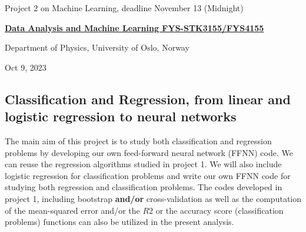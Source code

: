 \documentclass[%
oneside,                 %
final,                   %
10pt]{article}
\begin{document}

\newcommand{\exercisesection}[1]{\subsection*{#1}}






\thispagestyle{empty}

\begin{center}
{\LARGE\bf
\begin{spacing}{1.25}
Project 2 on Machine Learning, deadline November 13 (Midnight)
\end{spacing}
}
\end{center}


\begin{center}
{\bf \href{{http://www.uio.no/studier/emner/matnat/fys/FYS3155/index-eng.html}}{Data Analysis and Machine Learning FYS-STK3155/FYS4155}}
\end{center}

    \begin{center}
\centerline{{\small Department of Physics, University of Oslo, Norway}}
\end{center}
    

\begin{center}
Oct 9, 2023
\end{center}

\vspace{1cm}


\subsection*{Classification and Regression, from linear and logistic regression to neural networks}

The main aim of this project is to study both classification and
regression problems by developing our own feed-forward neural network
(FFNN) code. We can reuse the regression algorithms studied in project
1. We will also include logistic regression for classification
problems and write our own FFNN code for studying both regression and
classification problems.  The codes developed in project 1, including
bootstrap \textbf{and/or} cross-validation as well as the computation of the
mean-squared error and/or the $R2$ or the accuracy score
(classification problems) functions can also be utilized in the
present analysis.
\end{document}
